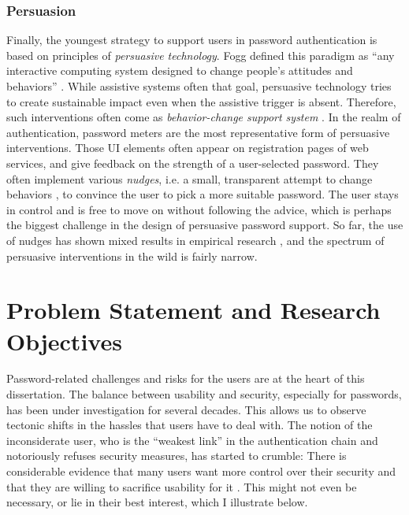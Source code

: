 \subsubsection{Persuasion}
Finally, the youngest strategy to support users in password authentication is based on principles of \textit{persuasive technology}. Fogg defined this paradigm as ``any interactive computing system designed to change people's attitudes and behaviors'' \cite[p. 1]{Fogg2002Persuasive}. While assistive systems often that goal, persuasive technology tries to create sustainable impact even when the assistive trigger is absent. Therefore, such interventions often come as \textit{behavior-change support system} \cite{Oinas-Kukkonen2013BCSS}. In the realm of authentication, password meters are the most representative form of persuasive interventions. Those \gls{UI} elements often appear on registration pages of web services, and give feedback on the strength of a user-selected password. They often implement various \textit{nudges}, i.e. a small, transparent attempt to change behaviors \cite[p. 4]{Thaler2008Nudge}, to convince the user to pick a more suitable password. The user stays in control and is free to move on without following the advice, which is perhaps the biggest challenge in the design of persuasive password support. So far, the use of nudges has shown mixed results in empirical research \cite{Egelman2013DoesMyPasswordGoUpToEleven, Renaud2017LessonsLearnedNudges, Ur2017DataDrivenPWMeter}, and the spectrum of persuasive interventions in the wild is fairly narrow. 

\section{Problem Statement and Research Objectives}
Password-related challenges and risks for the users are at the heart of this dissertation. The balance between usability and security, especially for passwords, has been under investigation for several decades. This allows us to observe tectonic shifts in the hassles that users have to deal with. 
The notion of the inconsiderate user, who is the ``weakest link'' in the authentication chain and notoriously refuses security measures, has started to crumble: There is considerable evidence that many users want more control over their security and that they are willing to sacrifice usability for it \cite{Kessem2018IBMFutureIdentity}. This might not even be necessary, or lie in their best interest, which I illustrate below. 
